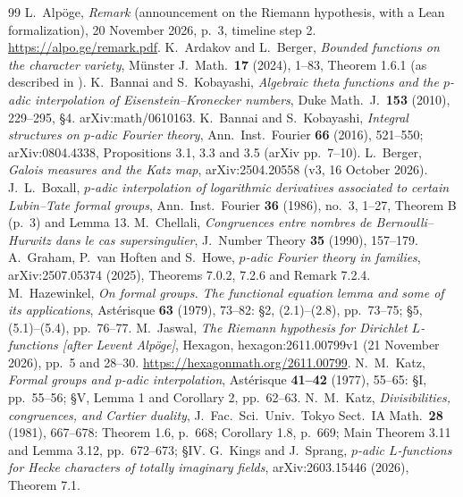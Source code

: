 \documentclass[11pt]{amsart}
\theoremstyle{definition}
\theoremstyle{remark}
\begin{document}
\begin{thebibliography}{99}
 L.~Alp\"oge, \emph{Remark} (announcement on the Riemann hypothesis, with a Lean formalization), 20 November 2026, p.~3, timeline step 2. \url{https://alpo.ge/remark.pdf}.
 K.~Ardakov and L.~Berger, \emph{Bounded functions on the character variety}, M\"unster J.\ Math.\ \textbf{17} (2024), 1--83, Theorem 1.6.1 (as described in \cite[Introduction]{Berger25}).
 K.~Bannai and S.~Kobayashi, \emph{Algebraic theta functions and the $p$-adic interpolation of Eisenstein--Kronecker numbers}, Duke Math.\ J.\ \textbf{153} (2010), 229--295, \S4. arXiv:math/0610163.
 K.~Bannai and S.~Kobayashi, \emph{Integral structures on $p$-adic Fourier theory}, Ann.\ Inst.\ Fourier \textbf{66} (2016), 521--550; arXiv:0804.4338, Propositions 3.1, 3.3 and 3.5 (arXiv pp.~7--10).
 L.~Berger, \emph{Galois measures and the Katz map}, arXiv:2504.20558 (v3, 16 October 2026).
 J.~L.~Boxall, \emph{$p$-adic interpolation of logarithmic derivatives associated to certain Lubin--Tate formal groups}, Ann.\ Inst.\ Fourier \textbf{36} (1986), no.~3, 1--27, Theorem B (p.~3) and Lemma 13.
 M.~Chellali, \emph{Congruences entre nombres de Bernoulli--Hurwitz dans le cas supersingulier}, J.\ Number Theory \textbf{35} (1990), 157--179.
 A.~Graham, P.~van Hoften and S.~Howe, \emph{$p$-adic Fourier theory in families}, arXiv:2507.05374 (2025), Theorems 7.0.2, 7.2.6 and Remark 7.2.4.
 M.~Hazewinkel, \emph{On formal groups. The functional equation lemma and some of its applications}, Ast\'erisque \textbf{63} (1979), 73--82: \S2, (2.1)--(2.8), pp.~73--75; \S5, (5.1)--(5.4), pp.~76--77.
 M.~Jaswal, \emph{The Riemann hypothesis for Dirichlet $L$-functions [after Levent Alp\"oge]}, Hexagon, hexagon:2611.00799v1 (21 November 2026), pp.~5 and 28--30. \url{https://hexagonmath.org/2611.00799}.
 N.~M.~Katz, \emph{Formal groups and $p$-adic interpolation}, Ast\'erisque \textbf{41--42} (1977), 55--65: \S I, pp.~55--56; \S V, Lemma 1 and Corollary 2, pp.~62--63.
 N.~M.~Katz, \emph{Divisibilities, congruences, and Cartier duality}, J.\ Fac.\ Sci.\ Univ.\ Tokyo Sect.\ IA Math.\ \textbf{28} (1981), 667--678: Theorem 1.6, p.~668; Corollary 1.8, p.~669; Main Theorem 3.11 and Lemma 3.12, pp.~672--673; \S IV.
 G.~Kings and J.~Sprang, \emph{$p$-adic $L$-functions for Hecke characters of totally imaginary fields}, arXiv:2603.15446 (2026), Theorem 7.1.

\end{thebibliography}
\end{document}
